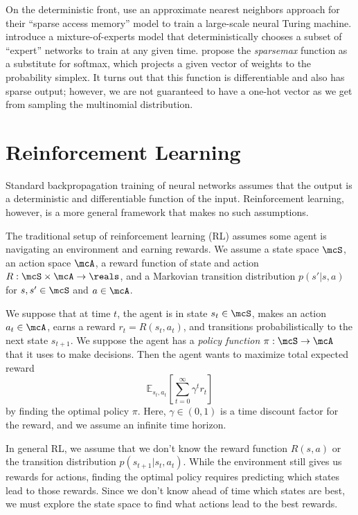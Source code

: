 \documentclass[12pt]{report}
\begin{document}
On the deterministic front, \citet{rae2016sparsememory} use an approximate nearest neighbors approach for their ``sparse access memory'' model to train a large-scale neural Turing machine.
\citet{Shazeer2017} introduce a mixture-of-experts model that deterministically chooses a subset of ``expert'' networks to train at any given time.
 \citet{martins2016sparsemax} propose the \emph{sparsemax} function as a substitute for softmax, which projects a given vector of weights to the probability simplex. It turns out that this function is differentiable and also has sparse output; however, we are not guaranteed to have a one-hot vector as we get from sampling the multinomial distribution.


\section{Reinforcement Learning}

Standard backpropagation training of neural networks assumes that the output is a deterministic and differentiable function of the input. Reinforcement learning, however, is a more general framework that makes no such assumptions.

The traditional setup of reinforcement learning (RL) assumes some agent is navigating an environment and earning rewards.
We assume a state space $\mcS$, an action space $\mcA$, a reward function of state and action $R : \mcS \times \mcA \to \reals$, and a Markovian transition distribution $p(s' | s, a)$ for $s, s' \in \mcS$ and $a \in \mcA$.

We suppose that at time $t$, the agent is in state $s_t \in \mcS$, makes an action $a_t \in \mcA$, earns a reward $r_t = R(s_t, a_t)$, and transitions probabilistically to the next state $s_{t+1}$. We suppose the agent has a \emph{policy function} $\pi : \mcS \to \mcA$ that it uses to make decisions. Then the agent wants to maximize total expected reward
$$\mathbb{E}_{s_t, a_t} \left[\sum_{t=0}^\infty \gamma^t r_t \right]$$
by finding the optimal policy $\pi$. Here, $\gamma \in (0,1)$ is a time discount factor for the reward, and we assume an infinite time horizon.


In general RL, we assume that we don't know the reward function $R(s,a)$ or the transition distribution $p(s_{t+1} | s_t, a_t)$. While the environment still gives us rewards for actions, finding the optimal policy requires predicting which states lead to those rewards.
Since we don't know ahead of time which states are best, we must explore the state space to find what actions lead to the best rewards.
\end{document}
